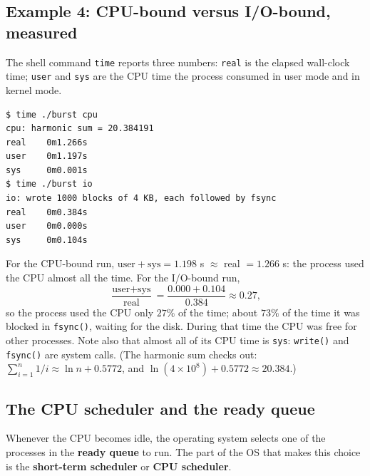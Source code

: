 \documentclass[11pt,a4paper]{article}
\newcommand{\term}[1]{\textbf{\color{mintdeep}#1}}
\newcommand{\cmd}[1]{\texttt{#1}}
\begin{document}
\subsection{Example 4: CPU-bound versus I/O-bound, measured}



The shell command \cmd{time} reports three numbers: \texttt{real} is the elapsed wall-clock time; \texttt{user} and \texttt{sys} are the CPU time the process consumed in user mode and in kernel mode.

\begin{lstlisting}[style=term]
$ time ./burst cpu
cpu: harmonic sum = 20.384191
real    0m1.266s
user    0m1.197s
sys     0m0.001s
$ time ./burst io
io: wrote 1000 blocks of 4 KB, each followed by fsync
real    0m0.384s
user    0m0.000s
sys     0m0.104s
\end{lstlisting}

\begin{example}
For the CPU-bound run, $\text{user}+\text{sys} = 1.198$ s $\approx$ real $= 1.266$ s: the process used the CPU almost all the time. For the I/O-bound run,
\[
\frac{\text{user} + \text{sys}}{\text{real}} = \frac{0.000 + 0.104}{0.384} \approx 0.27,
\]
so the process used the CPU only $27\%$ of the time; about $73\%$ of the time it was blocked in \cmd{fsync()}, waiting for the disk. During that time the CPU was free for other processes. Note also that almost all of its CPU time is \texttt{sys}: \cmd{write()} and \cmd{fsync()} are system calls. (The harmonic sum checks out: $\sum_{i=1}^{n} 1/i \approx \ln n + 0.5772$, and $\ln(4\times10^{8}) + 0.5772 \approx 20.384$.)
\end{example}

\subsection{The CPU scheduler and the ready queue}

Whenever the CPU becomes idle, the operating system selects one of the processes in the \term{ready queue} to run. The part of the OS that makes this choice is the \term{short-term scheduler} or \term{CPU scheduler}.
\end{document}

